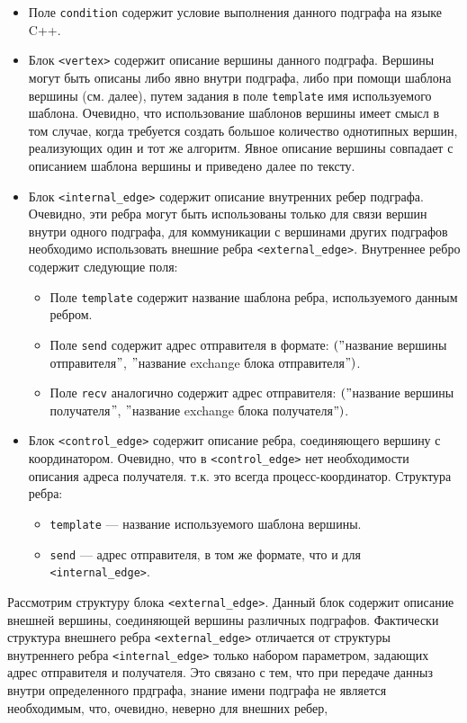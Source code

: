 \documentclass[a4paper, 12pt]{article}
\begin{document}
\begin{itemize}
\item Поле \lstinline$condition$ содержит условие выполнения данного подграфа на языке C++.
\item Блок \lstinline$<vertex>$ содержит описание вершины данного подграфа. Вершины могут быть описаны либо явно внутри подграфа, либо при помощи шаблона вершины (см. далее), путем задания в поле \lstinline$template$ имя используемого шаблона. Очевидно, что использование шаблонов вершины имеет смысл в том случае, когда требуется создать большое количество однотипных вершин, реализующих один и тот же алгоритм. Явное описание вершины совпадает с описанием шаблона вершины и приведено далее по тексту. 
\item Блок \lstinline$<internal_edge>$ содержит описание внутренних ребер подграфа. Очевидно, эти ребра могут быть использованы только для связи вершин внутри одного подграфа, для коммуникации с вершинами других подграфов необходимо использовать внешние ребра \lstinline$<external_edge>$. Внутреннее ребро содержит следующие поля:
	\begin{itemize}
		\item Поле \lstinline$template$ содержит название шаблона ребра, используемого данным ребром.
		\item Поле \lstinline$send$ содержит адрес отправителя в формате: $("$название вершины отправителя$"$, $"$название exchange блока отправителя$")$.
		\item Поле \lstinline$recv$ аналогично содержит адрес отправителя: $("$название вершины получателя$"$, $"$название exchange блока получателя$")$.
	\end{itemize}
\item Блок \lstinline$<control_edge>$ содержит описание ребра, соединяющего вершину с координатором. Очевидно, что в \lstinline$<control_edge>$ нет необходимости описания адреса получателя. т.к. это всегда процесс-координатор. Структура ребра:
	\begin{itemize}
		\item \lstinline$template$ --- название используемого шаблона вершины.
		\item \lstinline$send$ --- адрес отправителя, в том же формате, что и для \lstinline$<internal_edge>$.
	\end{itemize}
\end{itemize}
Рассмотрим структуру блока \lstinline$<external_edge>$. Данный блок содержит описание внешней вершины, соединяющей вершины различных подграфов. Фактически структура внешнего ребра \lstinline$<external_edge>$ отличается от структуры внутреннего ребра \lstinline$<internal_edge>$ только набором параметром, задающих адрес отправителя и получателя. Это связано с тем, что при передаче данныз внутри определенного прдграфа, знание имени подграфа не является необходимым, что, очевидно, неверно для внешних ребер,
\end{document}
